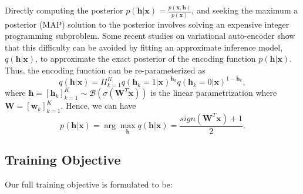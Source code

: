\documentclass[10pt,journal,twocolumn]{IEEEtran}
\begin{document}
Directly computing the posterior $p(\boldsymbol h| \boldsymbol x)=\frac{p(\boldsymbol x, \boldsymbol h)}{p(\boldsymbol x)}$, and seeking the maximum a posterior (MAP) solution to the posterior involves solving an expensive integer programming subproblem. Some recent studies on variational auto-encoder \cite{AEV,Mnih2014} show that this difficulty can be avoided by fitting an approximate inference model, $q(\boldsymbol h | \boldsymbol x)$, to approximate the exact posterior of the encoding function $p(\boldsymbol h| \boldsymbol x)$. Thus, the encoding function can be re-parameterized as
\begin{equation}\label{eq:encode-function}
  q(\boldsymbol h | \boldsymbol x) = \Pi_{k=1}^K q(\boldsymbol h_k=1| \boldsymbol x)^{\boldsymbol h_k} q(\boldsymbol h_k=0 | \boldsymbol x)^{1-\boldsymbol h_k},
\end{equation}
where $\boldsymbol h = [\boldsymbol h_k]_{k=1}^K \sim \mathcal{B}(\sigma(\boldsymbol W^T \boldsymbol x))$ is the linear parametrization where $\boldsymbol W=[\boldsymbol w_k]_{k=1}^K$. Hence, we can have
\begin{equation}\label{eq:hash-function}
  p(\boldsymbol h | \boldsymbol x)=\arg\max_{\boldsymbol h} q(\boldsymbol h | \boldsymbol x)=\frac{sign(\boldsymbol W^T \boldsymbol x) + 1}{2}.
\end{equation}




\subsection{Training Objective}

Our full training objective is formulated to be:
\end{document}
